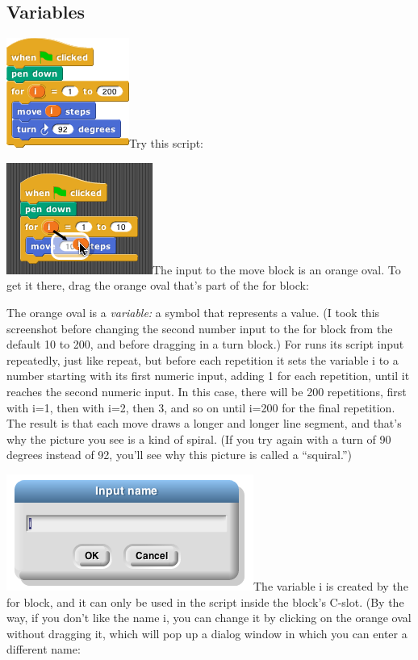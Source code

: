 \subsection{Variables}\label{variables}

\includegraphics[width=1.58333in,height=1.41667in]{media/image93.png}Try
this script:

\includegraphics[width=1.88542in,height=1.4375in]{media/image94.png}The
input to the move block is an orange oval. To get it there, drag the
orange oval that's part of the for block:

The orange oval is a \emph{variable:} a symbol that represents a value.
(I took this screenshot before changing the second number input to the
for block from the default 10 to 200, and before dragging in a turn
block.) For runs its script input repeatedly, just like repeat, but
before each repetition it sets the variable i to a number starting with
its first numeric input, adding 1 for each repetition, until it reaches
the second numeric input. In this case, there will be 200 repetitions,
first with i=1, then with i=2, then 3, and so on until i=200 for the
final repetition. The result is that each move draws a longer and longer
line segment, and that's why the picture you see is a kind of spiral.
(If you try again with a turn of 90 degrees instead of 92, you'll see
why this picture is called a ``squiral.'')

\includegraphics[width=3.1875in,height=1.5in]{media/image95.png}The
variable i is created by the for block, and it can only be used in the
script inside the block's C-slot. (By the way, if you don't like the
name i, you can change it by clicking on the orange oval without
dragging it, which will pop up a dialog window in which you can enter a
different name:


